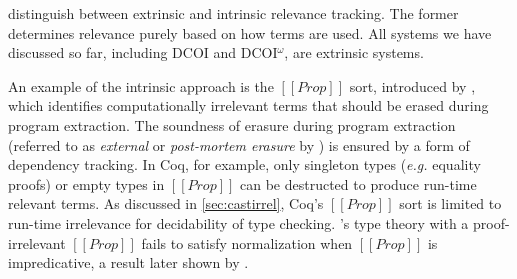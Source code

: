 \documentclass[acmsmall]{acmart}
\makeatletter
\theoremstyle{linked}
\theoremstyle{deflinked}
\theoremstyle{acmdefinition}
\newcommand{\dcoi}{DCOI\@\xspace}
\newcommand{\name}{\texorpdfstring{DCOI$^{\omega}$\@\xspace}{DCOI-omega}}
\newcommand{\eg}{\textit{e.g.}\@\xspace}
\makeatother
\begin{document}

\citet{mishra:erasure} distinguish between extrinsic and intrinsic
relevance tracking. The former determines relevance purely based on
how terms are used. All systems we have discussed so
far, including \dcoi and \name, are extrinsic systems.

An example of the intrinsic approach is
the $[[Prop]]$ sort, introduced by \citet{paulin-mohring:coc},
which identifies computationally irrelevant terms that
should be erased during program extraction.
The soundness of erasure during program extraction (referred to as
\emph{external} or \emph{post-mortem erasure} by
\citet{abel:irrelevance}) is ensured by a form of dependency
tracking. In Coq, for example,
only singleton types (\eg equality proofs) or empty
types in $[[Prop]]$ can be destructed to produce run-time
relevant terms.
As discussed in \cref{sec:castirrel},
Coq's $[[Prop]]$ sort is limited to run-time irrelevance for
decidability of type checking. \citet{werner:proofirrel}'s type theory with
a proof-irrelevant $[[Prop]]$ fails to satisfy normalization when
$[[Prop]]$ is impredicative, a result later shown by \citet{abel:failurenorm}.

\end{document}
